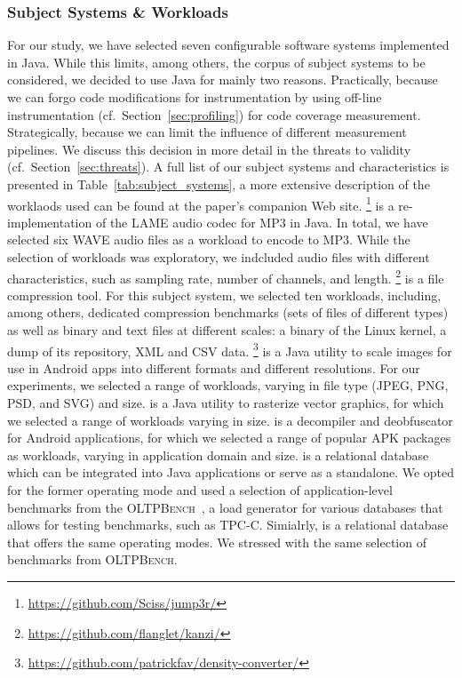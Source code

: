 \subsubsection{Subject Systems \& Workloads}

For our study, we have selected seven configurable software systems implemented in Java. While this limits, among others, the corpus of subject systems to be considered, we decided to use Java for mainly two reasons. Practically, because we can forgo code modifications for instrumentation by using off-line instrumentation (cf.~Section~\ref{sec:profiling}) for code coverage measurement. Strategically, because we can limit the influence of different measurement pipelines. We discuss this decision in more detail in the threats to validity (cf.~Section~\ref{sec:threats}). A full list of our subject systems and characteristics is presented in Table~\ref{tab:subject_systems}, a more extensive description of the worklaods used can be found at the paper's companion Web site.
\jumper\footnote{\url{https://github.com/Sciss/jump3r/}} is a re-implementation of the LAME audio codec for MP3 in Java. In total, we have selected {\color{red}six} WAVE audio files as a workload to encode to MP3. While the selection of workloads was exploratory, we indcluded audio files with different characteristics, such as sampling rate, number of channels, and length. 
\kanzi\footnote{\url{https://github.com/flanglet/kanzi/}} is a file compression tool. For this subject system, we selected {\color{red}ten} workloads, including, among others, dedicated compression benchmarks (sets of files of different types) as well as binary and text files at different scales: a binary of the Linux kernel, a dump of its repository, XML and CSV data. 
\dconvert\footnote{\url{https://github.com/patrickfav/density-converter/}} is a Java utility to scale images for use in Android apps into different formats and different resolutions. For our experiments, we selected a range of workloads, varying in file type (JPEG, PNG, PSD, and SVG) and size.
\batik is a Java utility to rasterize vector graphics, for which we selected a range of workloads varying in size.
\jadx is a decompiler and deobfuscator for Android applications, for which we selected a range of popular APK packages as workloads, varying in application domain and size.
\htwo is a relational database which can be integrated into Java applications or serve as a standalone. We opted for the former operating mode and used a selection of application-level benchmarks from the \textsc{OLTPBench}~\cite{difallah_oltp_2013}, a load generator for various databases that allows for testing benchmarks, such as TPC-C. Simialrly, \hsqldb is a relational database that offers the same operating modes. We stressed \hsqldb with the same selection of benchmarks from \textsc{OLTPBench}.


